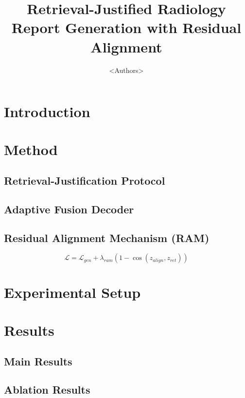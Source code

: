 \documentclass[11pt]{article}
\title{Retrieval-Justified Radiology Report Generation with Residual Alignment}
\author{<Authors>}\date{}
\begin{document}
\maketitle

\begin{abstract}
\end{abstract}

\section{Introduction}

\section{Method}
\subsection{Retrieval-Justification Protocol}

\subsection{Adaptive Fusion Decoder}

\subsection{Residual Alignment Mechanism (RAM)}
\[
\mathcal{L}=\mathcal{L}_{gen}+\lambda_{ram}(1-\cos(z_{align}, z_{ret}))
\]

\section{Experimental Setup}

\section{Results}
\subsection{Main Results}


\subsection{Ablation Results}

\end{document}

